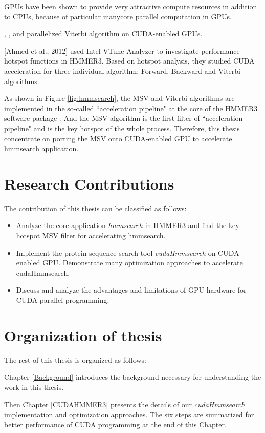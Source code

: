 GPUs have been shown to provide very attractive compute resources in addition to CPUs, because of particular manycore parallel computation in GPUs.

\citep{GPUHMM}, \citep{Ganesan}, \citep{Du} and \citep{Quirem} parallelized Viterbi algorithm on CUDA-enabled GPUs.

[Ahmed et al., 2012]\citep{Ahmed} used Intel VTune Analyzer \citep{Intel} to investigate performance hotspot functions in HMMER3. Based on hotspot analysis, they studied CUDA acceleration for three individual algorithm: Forward, Backward and Viterbi algorithms.

As shown in Figure \ref{fig:hmmsearch}, the MSV and Viterbi algorithms are implemented in the so-called ``acceleration pipeline" at the core of the HMMER3 software package \citep{HMMER3}. And the MSV algorithm is the first filter of ``acceleration pipeline" and is the key hotspot of the whole process. Therefore, this thesis concentrate on porting the MSV onto CUDA-enabled GPU to accelerate hmmsearch application.

\section{Research Contributions}
The contribution of this thesis can be classified as follows:
\begin{itemize}
 \item Analyze the core application \emph{hmmsearch} in HMMER3 and find the key hotspot MSV filter for accelerating hmmsearch.
 \item Implement the protein sequence search tool \emph{cudaHmmsearch} on CUDA-enabled GPU. Demonstrate many optimization approaches to accelerate cudaHmmsearch.
 \item Discuss and analyze the advantages and limitations of GPU hardware for CUDA parallel programming.
\end{itemize}

\section{Organization of thesis}
The rest of this thesis is organized as follows:

Chapter \ref{Background} introduces the background necessary for understanding the work in this thesis.

Then Chapter \ref{CUDAHMMER3} presents the details of our \emph{cudaHmmsearch} implementation and optimization approaches. The six steps are summarized for better performance of CUDA programming at the end of this Chapter.

